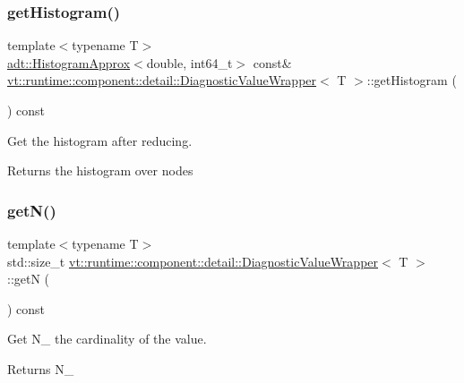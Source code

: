 \subsubsection{\texorpdfstring{get\+Histogram()}{getHistogram()}}
{\footnotesize\ttfamily template$<$typename T$>$ \\
\hyperlink{namespacevt_1_1adt_a486971e142bc22434d6afe695c43b599}{adt\+::\+Histogram\+Approx}$<$double, int64\+\_\+t$>$ const\& \hyperlink{structvt_1_1runtime_1_1component_1_1detail_1_1_diagnostic_value_wrapper}{vt\+::runtime\+::component\+::detail\+::\+Diagnostic\+Value\+Wrapper}$<$ T $>$\+::get\+Histogram (\begin{DoxyParamCaption}{ }\end{DoxyParamCaption}) const\hspace{0.3cm}{\ttfamily [inline]}}



Get the histogram after reducing. 

\begin{DoxyReturn}{Returns}
the histogram over nodes 
\end{DoxyReturn}
\mbox{\label{structvt_1_1runtime_1_1component_1_1detail_1_1_diagnostic_value_wrapper_a7672933780c70a48654ed26e92a68133}} 
\subsubsection{\texorpdfstring{get\+N()}{getN()}}
{\footnotesize\ttfamily template$<$typename T$>$ \\
std\+::size\+\_\+t \hyperlink{structvt_1_1runtime_1_1component_1_1detail_1_1_diagnostic_value_wrapper}{vt\+::runtime\+::component\+::detail\+::\+Diagnostic\+Value\+Wrapper}$<$ T $>$\+::getN (\begin{DoxyParamCaption}{ }\end{DoxyParamCaption}) const\hspace{0.3cm}{\ttfamily [inline]}}



Get {\ttfamily N\+\_\+} the cardinality of the value. 

\begin{DoxyReturn}{Returns}
{\ttfamily N\+\_\+} 
\end{DoxyReturn}
\mbox{\label{structvt_1_1runtime_1_1component_1_1detail_1_1_diagnostic_value_wrapper_af1f529fc5c73bf4da10b3d2864f01aa5}} 
